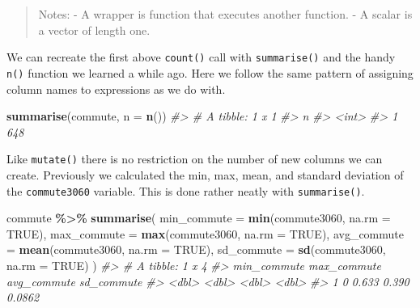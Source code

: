 \documentclass[
]{book}
\newenvironment{Shaded}{\begin{snugshade}}{\end{snugshade}}
\newcommand{\CommentTok}[1]{\textcolor[rgb]{0.56,0.35,0.01}{\textit{#1}}}
\newcommand{\DataTypeTok}[1]{\textcolor[rgb]{0.13,0.29,0.53}{#1}}
\newcommand{\KeywordTok}[1]{\textcolor[rgb]{0.13,0.29,0.53}{\textbf{#1}}}
\newcommand{\NormalTok}[1]{#1}
\newcommand{\OperatorTok}[1]{\textcolor[rgb]{0.81,0.36,0.00}{\textbf{#1}}}
\newcommand{\OtherTok}[1]{\textcolor[rgb]{0.56,0.35,0.01}{#1}}
\newcommand{\StringTok}[1]{\textcolor[rgb]{0.31,0.60,0.02}{#1}}
\begin{document}
\begin{quote}
Notes:
- A wrapper is function that executes another function.
- A scalar is a vector of length one.
\end{quote}

We can recreate the first above \texttt{count()} call with \texttt{summarise()} and the handy \texttt{n()} function we learned a while ago. Here we follow the same pattern of assigning column names to expressions as we do with.

\begin{Shaded}
\begin{Highlighting}[]
\KeywordTok{summarise}\NormalTok{(commute, }\DataTypeTok{n =} \KeywordTok{n}\NormalTok{())}
\CommentTok{\#\textgreater{} \# A tibble: 1 x 1}
\CommentTok{\#\textgreater{}       n}
\CommentTok{\#\textgreater{}   \textless{}int\textgreater{}}
\CommentTok{\#\textgreater{} 1   648}
\end{Highlighting}
\end{Shaded}

Like \texttt{mutate()} there is no restriction on the number of new columns we can create. Previously we calculated the min, max, mean, and standard deviation of the \texttt{commute3060} variable. This is done rather neatly with \texttt{summarise()}.

\begin{Shaded}
\begin{Highlighting}[]
\NormalTok{commute }\OperatorTok{\%\textgreater{}\%}\StringTok{ }
\StringTok{  }\KeywordTok{summarise}\NormalTok{(}
    \DataTypeTok{min\_commute =} \KeywordTok{min}\NormalTok{(commute3060, }\DataTypeTok{na.rm =} \OtherTok{TRUE}\NormalTok{),}
    \DataTypeTok{max\_commute =} \KeywordTok{max}\NormalTok{(commute3060, }\DataTypeTok{na.rm =} \OtherTok{TRUE}\NormalTok{),}
    \DataTypeTok{avg\_commute =} \KeywordTok{mean}\NormalTok{(commute3060, }\DataTypeTok{na.rm =} \OtherTok{TRUE}\NormalTok{),}
    \DataTypeTok{sd\_commute  =} \KeywordTok{sd}\NormalTok{(commute3060, }\DataTypeTok{na.rm =} \OtherTok{TRUE}\NormalTok{)}
\NormalTok{    )}
\CommentTok{\#\textgreater{} \# A tibble: 1 x 4}
\CommentTok{\#\textgreater{}   min\_commute max\_commute avg\_commute sd\_commute}
\CommentTok{\#\textgreater{}         \textless{}dbl\textgreater{}       \textless{}dbl\textgreater{}       \textless{}dbl\textgreater{}      \textless{}dbl\textgreater{}}
\CommentTok{\#\textgreater{} 1           0       0.633       0.390     0.0862}
\end{Highlighting}
\end{Shaded}
\end{document}
